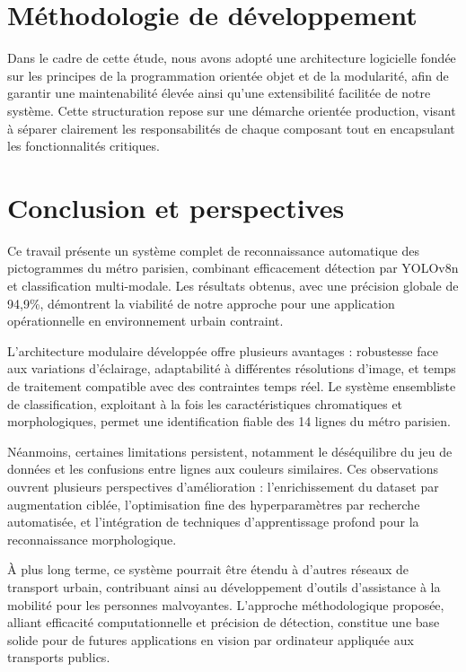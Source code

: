 \documentclass[journal]{IEEEtran}
\begin{document}
\section{Méthodologie de développement}

Dans le cadre de cette étude, nous avons adopté une architecture logicielle fondée sur les principes de la programmation orientée objet et de la modularité, afin de garantir une maintenabilité élevée ainsi qu'une extensibilité facilitée de notre système. Cette structuration repose sur une démarche orientée production, visant à séparer clairement les responsabilités de chaque composant tout en encapsulant les fonctionnalités critiques.

\section{Conclusion et perspectives}

Ce travail présente un système complet de reconnaissance automatique des pictogrammes du métro parisien, combinant efficacement détection par YOLOv8n et classification multi-modale. Les résultats obtenus, avec une précision globale de 94,9\%, démontrent la viabilité de notre approche pour une application opérationnelle en environnement urbain contraint.

L'architecture modulaire développée offre plusieurs avantages : robustesse face aux variations d'éclairage, adaptabilité à différentes résolutions d'image, et temps de traitement compatible avec des contraintes temps réel. Le système ensembliste de classification, exploitant à la fois les caractéristiques chromatiques et morphologiques, permet une identification fiable des 14 lignes du métro parisien.

Néanmoins, certaines limitations persistent, notamment le déséquilibre du jeu de données et les confusions entre lignes aux couleurs similaires. Ces observations ouvrent plusieurs perspectives d'amélioration : l'enrichissement du dataset par augmentation ciblée, l'optimisation fine des hyperparamètres par recherche automatisée, et l'intégration de techniques d'apprentissage profond pour la reconnaissance morphologique.

À plus long terme, ce système pourrait être étendu à d'autres réseaux de transport urbain, contribuant ainsi au développement d'outils d'assistance à la mobilité pour les personnes malvoyantes. L'approche méthodologique proposée, alliant efficacité computationnelle et précision de détection, constitue une base solide pour de futures applications en vision par ordinateur appliquée aux transports publics.
\end{document}

